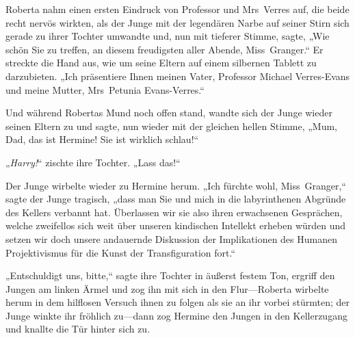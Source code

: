 Roberta nahm einen ersten Eindruck von Professor und Mrs~Verres auf, die beide recht nervös wirkten, als der Junge mit der legendären Narbe auf seiner Stirn sich gerade zu ihrer Tochter umwandte und, nun mit tieferer Stimme, sagte, „Wie schön Sie zu treffen, an diesem freudigsten aller Abende, Miss~Granger.“ Er streckte die Hand aus, wie um seine Eltern auf einem silbernen Tablett zu darzubieten. „Ich präsentiere Ihnen meinen Vater, Professor Michael Verres-Evans und meine Mutter, Mrs~Petunia Evans-Verres.“

Und während Robertas Mund noch offen stand, wandte sich der Junge wieder seinen Eltern zu und sagte, nun wieder mit der gleichen hellen Stimme, „Mum, Dad, das ist Hermine! Sie ist wirklich schlau!“

„\emph{Harry!}“ zischte ihre Tochter. „Lass das!“

Der Junge wirbelte wieder zu Hermine herum. „Ich fürchte wohl, Miss~Granger,“ sagte der Junge tragisch, „dass man Sie und mich in die labyrinthenen Abgründe des Kellers verbannt hat. Überlassen wir sie also ihren erwachsenen Gesprächen, welche zweifellos sich weit über unseren kindischen Intellekt erheben würden und setzen wir doch unsere andauernde Diskussion der Implikationen des Humanen Projektivismus für die Kunst der Transfiguration fort.“

„Entschuldigt uns, bitte,“ sagte ihre Tochter in äußerst festem Ton, ergriff den Jungen am linken Ärmel und zog ihn mit sich in den Flur—Roberta wirbelte herum in dem hilflosen Versuch ihnen zu folgen als sie an ihr vorbei stürmten; der Junge winkte ihr fröhlich zu—dann zog Hermine den Jungen in den Kellerzugang und knallte die Tür hinter sich zu.

